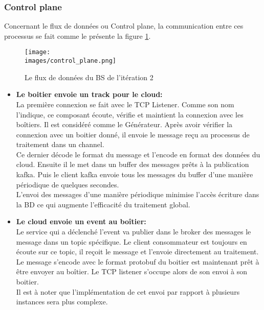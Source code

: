             \subsubsection{Control plane}
             Concernant le flux de données ou Control plane, la communication entre 
             ces processus se fait comme le présente la figure \ref{Figure : controlplane}. \\

             \begin{figure}[ht]
                \centering
                \texttt{[image: \\images/control\_plane.png]}
                \caption{Le flux de données du BS de l'itération 2}
                \label{Figure : controlplane}
            \end{figure}

            \begin{itemize}
                \renewcommand{\labelitemi}{$\bullet$}
                \item \textbf{Le boitier envoie un track pour le cloud:} \\
                La première connexion se fait avec le TCP Listener. 
                Comme son nom l’indique, ce composant écoute, vérifie et  maintient la 
                connexion avec les boîtiers. Il est considéré comme le Générateur. 
                Après avoir vérifier la connexion avec un boitier donné, il envoie le 
                message reçu au processus de traitement dans un channel. \\
                Ce dernier décode le format du message et l’encode en format des données du 
                cloud. Ensuite il le met dans un buffer des messages prêts à la publication 
                kafka. Puis le client kafka envoie tous les messages du buffer d’une manière 
                périodique de quelques secondes.\\ 
                L’envoi des messages d’une manière périodique minimise l'accès 
                écriture dans la BD ce qui augmente l’efficacité du traitement global. \\
                \item \textbf{ Le cloud envoie un event au boîtier:} \\
                Le service qui a déclenché l’event va publier dans le broker des messages le 
                message dans un topic spécifique. Le client consommateur est toujours en écoute sur ce topic, 
                il reçoit le message et l'envoie directement au traitement. Le message s’encode avec le format 
                protobuf du boitier est maintenant prêt à être envoyer au boîtier. Le TCP listener s’occupe alors 
                de son envoi à son boitier. \\
                Il est à noter que l'implémentation de cet envoi par rapport à plusieurs 
                instances sera plus complexe. 
            \end{itemize}
            


